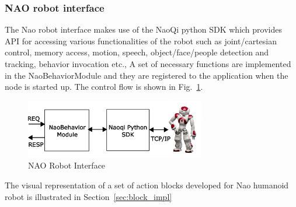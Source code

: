 \subsubsection{NAO robot interface}
\label{sssec:nao_interface}
The Nao robot interface makes use of the NaoQi python SDK which provides API for accessing various functionalities of the robot such as joint/cartesian control, memory access, motion, speech, object/face/people detection and tracking, behavior invocation etc., A set of necessary functions are implemented in the NaoBehaviorModule and they are registered to the application when the node is started up. The control flow is shown in Fig.~\ref{fig:nao_interface}.
\begin{figure}[H]
\centering
\includegraphics[width=0.7\textwidth]{assets/NaoBehaviorModule.eps}
\caption[NAO Robot Interface]{NAO Robot Interface}
\label{fig:nao_interface}
\end{figure}
The visual representation of a set of action blocks developed for Nao humanoid robot is illustrated in Section~\ref{sec:block_impl}
